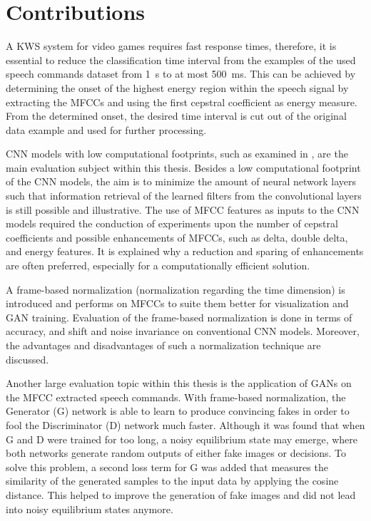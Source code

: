
\section{Contributions}
A KWS system for video games requires fast response times, therefore, it is essential to reduce the classification time interval from the examples of the used speech commands dataset \cite{Warden2018} from \SI{1}{\second} to at most \SI{500}{\milli\second}.
This can be achieved by determining the onset of the highest energy region within the speech signal by extracting the MFCCs and using the first cepstral coefficient as energy measure.
From the determined onset, the desired time interval is cut out of the original data example and used for further processing.

CNN models with low computational footprints, such as examined in \cite{Sainath2015}, are the main evaluation subject within this thesis.
Besides a low computational footprint of the CNN models, the aim is to minimize the amount of neural network layers such that information retrieval of the learned filters from the convolutional layers is still possible and illustrative.
The use of MFCC features as inputs to the CNN models required the conduction of experiments upon the number of cepstral coefficients and possible enhancements of MFCCs, such as delta, double delta, and energy features.
It is explained why a reduction and sparing of enhancements are often preferred, especially for a computationally efficient solution.

A frame-based normalization (normalization regarding the time dimension) is introduced and performs on MFCCs to suite them better for visualization and GAN training.
Evaluation of the frame-based normalization is done in terms of accuracy, and shift and noise invariance on conventional CNN models.
Moreover, the advantages and disadvantages of such a normalization technique are discussed.

Another large evaluation topic within this thesis is the application of GANs on the MFCC extracted speech commands. 
With frame-based normalization, the Generator (G) network is able to learn to produce convincing fakes in order to fool the Discriminator (D) network much faster.
Although it was found that when G and D were trained for too long, a noisy equilibrium state may emerge, where both networks generate random outputs of either fake images or decisions.
To solve this problem, a second loss term for G was added that measures the similarity of the generated samples to the input data by applying the cosine distance.
This helped to improve the generation of fake images and did not lead into noisy equilibrium states anymore.

